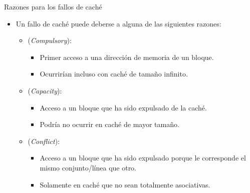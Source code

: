\begin{frame}[t]{Razones para los fallos de caché}
\begin{itemize}
  \item Un fallo de caché puede deberse a alguna de las siguientes razones:

    \begin{itemize}
    
      \item {} (\emph{Compulsory}):
        \begin{itemize}
          \item Primer acceso a una dirección de memoria de un bloque.
          \item Ocurrirían incluso con caché de tamaño infinito.
        \end{itemize}

      \item {} (\emph{Capacity}):
        \begin{itemize}
          \item Acceso a un bloque que ha sido expulsado de la caché.
          \item Podría no ocurrir en caché de mayor tamaño.
        \end{itemize}

      \item {} (\emph{Conflict}):
        \begin{itemize}
          \item Acceso a un bloque que ha sido expulsado porque le corresponde 
                el mismo conjunto/línea que otro.
          \item Solamente en caché que no sean totalmente asociativas.
        \end{itemize}
    \end{itemize}
\end{itemize}
\end{frame}


